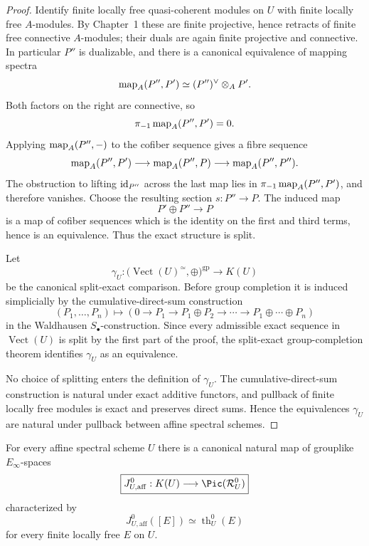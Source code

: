 \begin{proof}
Identify finite locally free quasi-coherent modules on \(U\) with finite
locally free \(A\)-modules.  By Chapter~1 these are finite projective, hence
retracts of finite free connective \(A\)-modules; their duals are again finite
projective and connective.  In particular \(P''\) is dualizable, and there is a
canonical equivalence of mapping spectra
\[
  \operatorname{map}_A(P'',P')
  \simeq
  (P'')^\vee\otimes_AP'.
\]
Both factors on the right are connective, so
\[
  \pi_{-1}\operatorname{map}_A(P'',P')=0.
\]
Applying \(\operatorname{map}_A(P'',-)\) to the cofiber sequence gives a fibre sequence
\[
  \operatorname{map}_A(P'',P')
  \longrightarrow
  \operatorname{map}_A(P'',P)
  \longrightarrow
  \operatorname{map}_A(P'',P'').
\]
The obstruction to lifting \(\operatorname{id}_{P''}\) across the last map lies in
\(\pi_{-1}\operatorname{map}_A(P'',P')\), and therefore vanishes.  Choose the resulting
section \(s:P''\to P\).  The induced map
\[
  P'\oplus P''\longrightarrow P
\]
is a map of cofiber sequences which is the identity on the first and third
terms, hence is an equivalence.  Thus the exact structure is split.

Let
\[
    \gamma_U:
    \bigl(\operatorname{Vect}(U)^\simeq,\oplus\bigr)^{\mathrm{gp}}
    \longrightarrow
    K(U)
\]
be the canonical split-exact comparison.  Before group completion it is
induced simplicially by the cumulative-direct-sum construction
\[
    (P_1,\ldots,P_n)
    \longmapsto
    \left(
      0\to P_1\to
      P_1\oplus P_2\to\cdots\to
      P_1\oplus\cdots\oplus P_n
    \right)
\]
in the Waldhausen \(S_\bullet\)-construction.  Since every admissible exact
sequence in \(\operatorname{Vect}(U)\) is split by the first part of the proof,
the split-exact group-completion theorem identifies $\gamma_U$ as an
equivalence.

No choice of splitting enters the definition of $\gamma_U$.  The
cumulative-direct-sum construction is natural under exact additive functors,
and pullback of finite locally free modules is exact and preserves direct
sums.  Hence the equivalences $\gamma_U$ are natural under pullback between
affine spectral schemes.
\end{proof}

\begin{proposition}
\label{prop:bn-diff-affine-j}
For every affine spectral scheme \(U\) there is a canonical natural map of
grouplike \(E_\infty\)-spaces
\[
  \boxed{
  J_{U,\mathrm{aff}}^0:
  K(U)
  \longrightarrow
  \Pic(\mathcal R_U^0)
  }
\]
characterized by
\[
  J_{U,\mathrm{aff}}^0([E])
  \simeq
  \operatorname{th}^0_U(E)
\]
for every finite locally free \(E\) on \(U\).
\end{proposition}


